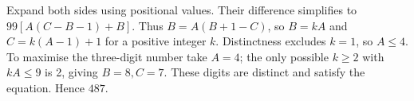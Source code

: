 Expand both sides using positional values. Their difference simplifies to $99[A(C-B-1)+B]$. Thus $B=A(B+1-C)$, so $B=kA$ and $C=k(A-1)+1$ for a positive integer $k$. Distinctness excludes $k=1$, so $A\le4$. To maximise the three-digit number take $A=4$; the only possible $k\ge2$ with $kA\le9$ is 2, giving $B=8,C=7$. These digits are distinct and satisfy the equation. Hence $\boxed{487}$.
